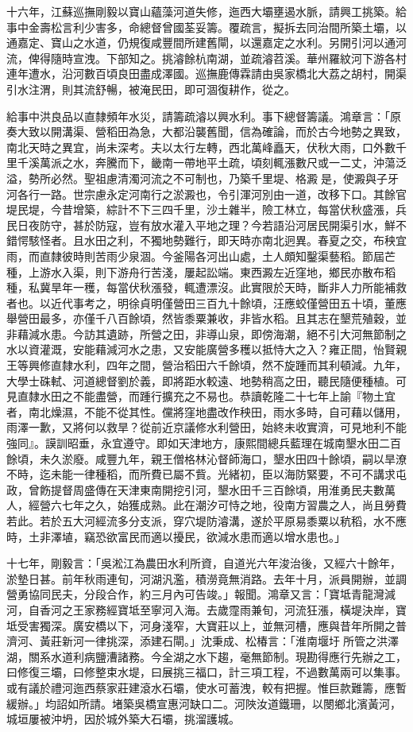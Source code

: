 \begin{pinyinscope}
十六年，江蘇巡撫剛毅以寶山蘊藻河道失修，迤西大壩壅遏水脈，請興工挑築。給事中金壽松言利少害多，命總督曾國荃妥籌。覆疏言，擬拆去同治間所築土壩，以通嘉定、寶山之水道，仍規復咸豐間所建舊閘，以還嘉定之水利。另開引河以通河流，俾得隨時宣洩。下部知之。挑濬餘杭南湖，並疏濬苕溪。華州羅紋河下游各村連年遭水，沿河數百頃良田盡成澤國。巡撫鹿傳霖請由吳家橋北大荔之胡村，開渠引水注渭，則其流舒暢，被淹民田，即可涸復耕作，從之。

給事中洪良品以直隸頻年水災，請籌疏濬以興水利。事下總督籌議。鴻章言：「原奏大致以開溝渠、營稻田為急，大都沿襲舊聞，信為確論，而於古今地勢之異致，南北天時之異宜，尚未深考。夫以太行左轉，西北萬峰矗天，伏秋大雨，口外數千里千溪萬派之水，奔騰而下，畿南一帶地平土疏，頃刻輒漲數尺或一二丈，沖蕩泛溢，勢所必然。聖祖慮清濁河流之不可制也，乃築千里堤、格澱是，使澱與子牙河各行一路。世宗慮永定河南行之淤澱也，令引渾河別由一道，改移下口。其餘官堤民堤，今昔增築，綜計不下三四千里，沙土雜半，險工林立，每當伏秋盛漲，兵民日夜防守，甚於防寇，豈有放水灌入平地之理？今若語沿河居民開渠引水，鮮不錯愕駭怪者。且水田之利，不獨地勢難行，即天時亦南北迥異。春夏之交，布秧宜雨，而直隸彼時則苦雨少泉涸。今釜陽各河出山處，土人頗知鑿渠藝稻。節屆芒種，上游水入渠，則下游舟行苦淺，屢起訟端。東西澱左近窪地，鄉民亦散布稻種，私冀旱年一穫，每當伏秋漲發，輒遭漂沒。此實限於天時，斷非人力所能補救者也。以近代事考之，明徐貞明僅營田三百九十餘頃，汪應蛟僅營田五十頃，董應舉營田最多，亦僅千八百餘頃，然皆黍粟兼收，非皆水稻。且其志在墾荒殖穀，並非藉減水患。今訪其遺跡，所營之田，非導山泉，即傍海潮，絕不引大河無節制之水以資灌溉，安能藉減河水之患，又安能廣營多穫以抵恃大之入？雍正間，怡賢親王等興修直隸水利，四年之間，營治稻田六千餘頃，然不旋踵而其利頓減。九年，大學士硃軾、河道總督劉於義，即將距水較遠、地勢稍高之田，聽民隨便種植。可見直隸水田之不能盡營，而踵行擴充之不易也。恭讀乾隆二十七年上諭『物土宜者，南北燥濕，不能不從其性。儻將窪地盡改作秧田，雨水多時，自可藉以儲用，雨澤一歉，又將何以救旱？從前近京議修水利營田，始終未收實濟，可見地利不能強同』。謨訓昭垂，永宜遵守。即如天津地方，康熙間總兵藍理在城南墾水田二百餘頃，未久淤廢。咸豐九年，親王僧格林沁督師海口，墾水田四十餘頃，嗣以旱潦不時，迄未能一律種稻，而所費已屬不貲。光緒初，臣以海防緊要，不可不講求屯政，曾飭提督周盛傳在天津東南開挖引河，墾水田千三百餘頃，用淮勇民夫數萬人，經營六七年之久，始獲成熟。此在潮汐可恃之地，役南方習農之人，尚且勞費若此。若於五大河經流多分支派，穿穴堤防濬溝，遂於平原易黍粟以秔稻，水不應時，土非澤埴，竊恐欲富民而適以擾民，欲減水患而適以增水患也。」

十七年，剛毅言：「吳淞江為農田水利所資，自道光六年浚治後，又經六十餘年，淤墊日甚。前年秋雨連旬，河湖汎濫，積澇竟無消路。去年十月，派員開辦，並調營勇協同民夫，分段合作，約三月內可告竣。」報聞。鴻章又言：「寶坻青龍灣減河，自香河之王家務經寶坻至寧河入海。去歲霪雨兼旬，河流狂漲，橫堤決岸，寶坻受害獨深。廣安橋以下，河身淺窄，大寶莊以上，並無河槽，應與昔年所開之普濟河、黃莊新河一律挑深，添建石閘。」沈秉成、松椿言：「淮南堰圩所管之洪澤湖，關系水道利病鹽漕諸務。今全湖之水下趨，毫無節制。現勘得應行先辦之工，曰修復三壩，曰修整束水堤，曰展挑三福口，計三項工程，不過數萬兩可以集事。或有議於禮河迤西蔡家莊建滾水石壩，使水可蓄洩，較有把握。惟巨款難籌，應暫緩辦。」均詔如所請。堵築吳橋宣惠河缺口二。河陜汝道鐵珊，以閿鄉北濱黃河，城垣屢被沖坍，因於城外築大石壩，挑溜護城。


\end{pinyinscope}
